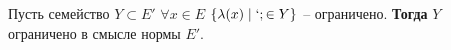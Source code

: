 Пусть семейство $Y \subset E'$ $\forall x \in E$ $\{\lambda(x) \mid  `; \in Y\}$ -- ограничено. \textbf{Тогда } $Y$ ограничено в смысле нормы $E'$.